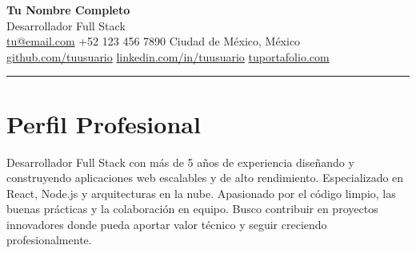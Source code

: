 \documentclass[11pt,a4paper]{article}
\begin{document}
\begin{center}
  {\Huge\bfseries\color{darktext} Tu Nombre Completo}\\[8pt]
  {\large\color{accent} Desarrollador Full Stack}\\[12pt]
  {\small\color{graytext}
    \faEnvelope\hspace{4pt}\href{mailto:tu@email.com}{tu@email.com}
    \hspace{12pt}
    \faPhone*\hspace{4pt}+52 123 456 7890
    \hspace{12pt}
    \faMapMarker*\hspace{4pt}Ciudad de México, México
  }\\[4pt]
  {\small\color{graytext}
    \faGithub\hspace{4pt}\href{https://github.com/tuusuario}{github.com/tuusuario}
    \hspace{12pt}
    \faLinkedin\hspace{4pt}\href{https://linkedin.com/in/tuusuario}{linkedin.com/in/tuusuario}
    \hspace{12pt}
    \faGlobe\hspace{4pt}\href{https://tuportafolio.com}{tuportafolio.com}
  }
\end{center}

\vspace{-2pt}
\textcolor{accent}{\rule{\linewidth}{2pt}}
\vspace{6pt}

\section{\faUser\hspace{6pt}Perfil Profesional}

Desarrollador Full Stack con más de 5 años de experiencia diseñando y
construyendo aplicaciones web escalables y de alto rendimiento.
Especializado en React, Node.js y arquitecturas en la nube.
Apasionado por el código limpio, las buenas prácticas y la
colaboración en equipo. Busco contribuir en proyectos innovadores
donde pueda aportar valor técnico y seguir creciendo profesionalmente.
\end{document}
